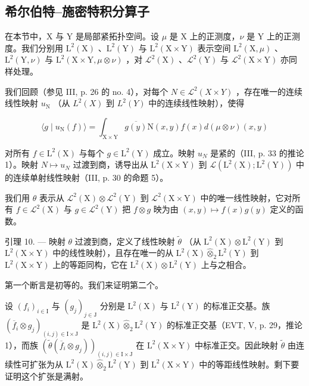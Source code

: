 \subsection{希尔伯特--施密特积分算子}

在本节中，X 与 Y 是局部紧拓扑空间。设 \(\mu\) 是 X 上的正测度，\(\nu\) 是 Y 上的正测度。我们分别用 \(\mathrm{L}^{2}(\mathrm{X})\) 、\(\mathrm{L}^{2}(\mathrm{Y})\) 与 \(\mathrm{L}^{2}(\mathrm{X} \times \mathrm{Y})\) 表示空间 \(\mathrm{L}^{2}(\mathrm{X}, \mu)\) 、\(\mathrm{L}^{2}(\mathrm{Y}, \nu)\) 与 \(\mathrm{L}^{2}(\mathrm{X} \times \mathrm{Y}, \mu \otimes \nu)\) ，对 \(\mathcal{L}^{2}(\mathrm{X})\) 、\(\mathcal{L}^{2}(\mathrm{Y})\) 与 \(\mathcal{L}^{2}(\mathrm{X} \times \mathrm{Y})\) 亦同样处理。

我们回顾（参见 III, p. 26 的 no. 4），对每个 \(N \in \mathcal{L}^{2}(X \times Y)\) ，存在唯一的连续线性映射 \(u_{\mathrm{N}}\) （从 \(L^{2}(X)\) 到 \(L^{2}(Y)\) 中的连续线性映射），使得

\[
\langle g \mid u _ {\mathrm{N}} (f) \rangle = \int_ {\mathrm{X} \times \mathrm{Y}} \overline {{g (y)}} \mathrm{N} (x, y) f (x) d (\mu \otimes \nu) (x, y)\tag{12}
\]

对所有 \(f \in \mathrm{L}^{2}(\mathrm{X})\) 与每个 \(g \in \mathrm{L}^{2}(\mathrm{Y})\) 成立。映射 \(u_{N}\) 是紧的（III, p. 33 的推论 1）。映射 \(N \mapsto u_{N}\) 过渡到商，诱导出从 \(\mathrm{L}^{2}(\mathrm{X} \times \mathrm{Y})\) 到 \(\mathcal{L}(\mathrm{L}^{2}(\mathrm{X});\mathrm{L}^{2}(\mathrm{Y}))\) 中的连续单射线性映射（III, p. 30 的命题 5）。

我们用 \(\theta\) 表示从 \(\mathcal{L}^2 (\mathrm{X})\otimes \mathcal{L}^2 (\mathrm{Y})\) 到 \(\mathcal{L}^2 (\mathrm{X}\times \mathrm{Y})\) 中的唯一线性映射，它对所有 \(f\in \mathcal{L}^2 (\mathrm{X})\) 与 \(g\in \mathcal{L}^2 (\mathrm{Y})\) 把 \(f\otimes g\) 映为由 \((x,y)\mapsto f(x)g(y)\) 定义的函数。

引理 10. --- 映射 \(\theta\) 过渡到商，定义了线性映射 \(\widetilde{\theta}\) （从 \(\mathrm{L}^2 (\mathrm{X})\otimes \mathrm{L}^2 (\mathrm{Y})\) 到 \(\mathrm{L}^2 (\mathrm{X}\times \mathrm{Y})\) 中的线性映射），且存在唯一的从 \(\mathrm{L}^2 (\mathrm{X})\widehat{\otimes}_2\mathrm{L}^2 (\mathrm{Y})\) 到 \(\mathrm{L}^2 (\mathrm{X}\times \mathrm{Y})\) 上的等距同构，它在 \(\mathrm{L}^2 (\mathrm{X})\otimes \mathrm{L}^2 (\mathrm{Y})\) 上与之相合。

第一个断言是初等的。我们来证明第二个。

设 \((f_i)_{i\in \mathrm{I}}\) 与 \((g_j)_{j\in \mathrm{J}}\) 分别是 \(\mathrm{L}^2 (\mathrm{X})\) 与 \(\mathrm{L}^2 (\mathrm{Y})\) 的标准正交基。族 \((\overline{f}_i\otimes g_j)_{(i,j)\in \mathrm{I}\times \mathrm{J}}\) 是 \(\mathrm{L}^2 (\mathrm{X})\widehat{\otimes}_2\mathrm{L}^2 (\mathrm{Y})\) 的标准正交基（EVT, V, p. 29，推论 1），而族 \((\widetilde{\theta} (\overline{f}_i\otimes g_j))_{(i,j)\in \mathrm{I}\times \mathrm{J}}\) 在 \(\mathrm{L}^2 (\mathrm{X}\times \mathrm{Y})\) 中标准正交。因此映射 \(\widetilde{\theta}\) 由连续性可扩张为从 \(\mathrm{L}^2 (\mathrm{X})\widehat{\otimes}_2\mathrm{L}^2 (\mathrm{Y})\) 到 \(\mathrm{L}^2 (\mathrm{X}\times \mathrm{Y})\) 中的等距线性映射。剩下要证明这个扩张是满射。

